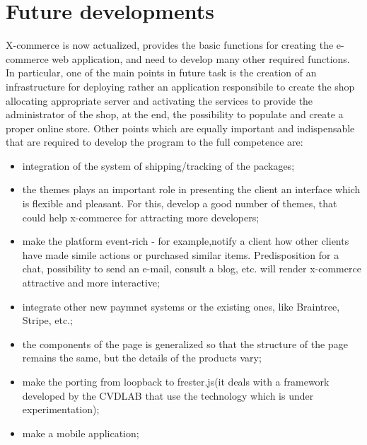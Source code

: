 \section{Future developments}
\label{sec:future_work}
X-commerce is now actualized, provides the basic functions for creating the e-commerce web application, and need to develop many other required functions.
In particular, one of the main points in future task is the creation of an infrastructure for deploying rather an application responsibile to create the shop allocating appropriate server and activating the services to provide the administrator of the shop, at the end, the possibility to populate and create a proper online store.
\newline
Other points which are equally important and indispensable that are required to develop the program to the full competence are:
\begin{itemize}
\item integration of the system of shipping/tracking of the packages;
\item the themes plays an important role in presenting the client an interface which is flexible and pleasant. For this, develop a good number of themes, that could help x-commerce for attracting more developers;
\item make the platform event-rich - for example,notify a client how other clients have made simile actions or purchased similar items. Predisposition for a chat, possibility to send an e-mail, consult a blog, etc. will render x-commerce attractive and more interactive;
\item integrate other new paymnet systems or the existing ones, like Braintree, Stripe, etc.;
\item the components of the page is generalized so that the structure of the page remains the same, but the details of the products vary;
\item make the porting from loopback to frester.js(it deals with a framework developed by the CVDLAB that use the technology which is under experimentation);
\item make a mobile application;
\end{itemize}